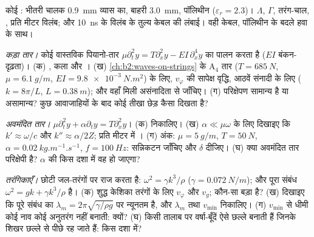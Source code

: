 \begin{exercise}[$\star$]\label{exo:b2:dispersion-wave-packets:4}
कोई : भीतरी चालक \qty{0.9}{mm} व्यास का, बाहरी
\qty{3.0}{mm}, पॉलिथीन ($\varepsilon_r = 2.3$)। $\Lambda$, $\Gamma$, तरंग-चाल,
, प्रति मीटर विलंब; और \qty{10}{ns} के विलंब के तुल्य
केबल की लंबाई। वही केबल, पॉलिथीन के बदले हवा के साथ।
\end{exercise}

\begin{exercise}[$\star\star$]\label{exo:b2:dispersion-wave-packets:5}
\emph{कड़ा तार।} कोई वास्तविक पियानो-तार $\mu\partial_t^2y = T\partial_x^2y
- EI\,\partial_x^4y$ का पालन करता है ($EI$ बंकन-दृढ़ता)। (क) ,
कला और । (ख) \cref{ch:b2:waves-on-strings} के A$_4$ तार
($T = \qty{685}{N}$, $\mu = \qty{6.1}{g/m}$, $EI =
\qty{9.8e-3}{N.m^2}$) के लिए, $v_\varphi$ की सापेक्ष वृद्धि, आठवें संनादी के
लिए ($k = 8\pi/L$, $L = \qty{0.38}{m}$); और वहाँ मिली असंनादिता से जाँचिए। (ग) परिक्षेपण
सामान्य है या असामान्य? कुछ आवाजाहियों के बाद कोई तीखा छेड़
कैसा दिखता है?
\end{exercise}

\begin{exercise}[$\star\star$]\label{exo:b2:dispersion-wave-packets:6}
\emph{अवमंदित तार।} $\mu\partial_t^2y + \alpha\partial_ty = T\partial_x^2y$। (क)
 निकालिए। (ख) $\alpha \ll \mu\omega$ के लिए दिखाइए कि $k' \approx \omega/c$ और
$k'' \approx \alpha/2Z$; प्रति मीटर  में । (ग) अंक: $\mu =
\qty{5}{g/m}$, $T = \qty{50}{N}$, $\alpha = \qty{0.02}{kg.m^{-1}.s^{-1}}$, $f =
\qty{100}{Hz}$: सन्निकटन जाँचिए और $\delta$ दीजिए। (घ) क्या अवमंदित
तार परिक्षेपी है? $\alpha$ की किस दशा में वह हो जाएगा?
\end{exercise}

\begin{exercise}[$\star\star$]\label{exo:b2:dispersion-wave-packets:7}
\emph{तरंगिकाएँ।} छोटी जल-तरंगों पर  राज करता है: $\omega^2 =
\gamma k^3/\rho$ ($\gamma = \qty{0.072}{N/m}$); और पूरा संबंध $\omega^2 = gk +
\gamma k^3/\rho$ है। (क) शुद्ध केशिका तरंगों के लिए $v_\varphi$ और $v_g$; कौन-सा
बड़ा है? (ख) दिखाइए कि पूरे संबंध का 
$\lambda_m = 2\pi\sqrt{\gamma/\rho g}$ पर न्यूनतम है, और $\lambda_m$ तथा $v_{\min}$ निकालिए।
(ग) $v_{\min}$ से धीमी कोई नाव कोई अनुतरंग नहीं बनाती: क्यों? (घ) किसी तालाब पर
वर्षा-बूँदें ऐसे छल्ले बनाती हैं जिनके शिखर छल्ले से पीछे रह जाते हैं: किस दशा में?
\end{exercise}

